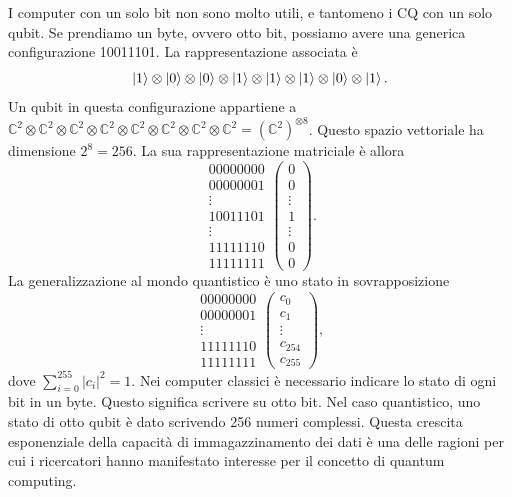I computer con un solo bit non sono molto utili, e tantomeno i \ac{CQ} con 
un solo qubit. Se prendiamo un byte, ovvero otto bit, possiamo avere una generica 
configurazione 10011101. La rappresentazione associata è 
\begin{equation}
    \ket{1}\otimes\ket{0}\otimes\ket{0}\otimes\ket{1}\otimes\ket{1}\otimes\ket{1}\otimes\ket{0}\otimes\ket{1}.
\end{equation}
Un qubit in questa configurazione appartiene a $\mathbb{C}^2\otimes\mathbb{C}^2\otimes\mathbb{C}^2\otimes\mathbb{C}^2\otimes\mathbb{C}^2\otimes\mathbb{C}^2\otimes\mathbb{C}^2\otimes\mathbb{C}^2 = (\mathbb{C}^2)^{\otimes 8}$. 
Questo spazio vettoriale ha dimensione $2^8=256$. La sua rappresentazione matriciale è allora
\begin{equation}
    \begin{matrix}
        00000000 \\ 
        00000001 \\ 
        \vdots \\ 
        10011101 \\
        \vdots \\
        11111110 \\ 
        11111111
    \end{matrix}
    \begin{pmatrix}
        0 \\ 0 \\ \vdots \\ 1 \\ \vdots \\ 0 \\ 0
    \end{pmatrix}
    .
\end{equation}
La generalizzazione al mondo quantistico è uno stato in sovrapposizione 
\begin{equation}
    \begin{matrix}
        00000000 \\ 
        00000001 \\ 
        \vdots \\
        11111110 \\ 
        11111111
    \end{matrix}
    \begin{pmatrix}
        c_0 \\ c_1 \\ \vdots \\ c_{254} \\ c_{255}
    \end{pmatrix},
\end{equation}
dove $\sum_{i=0}^{255}|c_i|^2=1$. 
Nei computer classici è necessario indicare lo stato di ogni bit in un byte. 
Questo significa scrivere su otto bit. Nel caso quantistico, uno stato di otto 
qubit è dato scrivendo 256 numeri complessi. Questa crescita esponenziale della 
capacità di immagazzinamento dei dati è una delle ragioni per cui i ricercatori 
hanno manifestato interesse per il concetto di quantum computing. 

